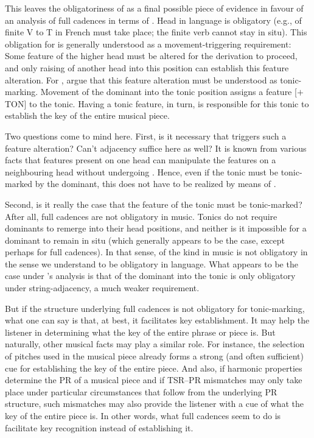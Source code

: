 \documentclass[output=paper]{langsci/langscibook}
\begin{document}
This leaves the obligatoriness of  as a final possible piece of
evidence in favour of an analysis of full cadences in terms of .
Head  in language is obligatory (e.g.,  of finite V to T in
French must take place; the finite verb cannot stay in situ). This obligation
for  is generally understood as a movement-triggering requirement:
Some feature of the higher head must be altered for the derivation to proceed,
and only raising of another head into this position can establish this feature
alteration. For , \citeauthor{KatzPes2011} argue that this feature
alteration must be understood as tonic-marking. Movement of the dominant into
the tonic position assigns a feature [$+$TON] to the tonic. Having a tonic
feature, in turn, is responsible for this tonic to establish the key of the
entire musical piece.

Two questions come to mind here. First, is it necessary that  triggers
such a feature alteration? Can’t adjacency suffice here as well? It is known
from various  facts that features present on one head can
manipulate the features on a neighbouring head without undergoing .
Hence, even if the tonic must be tonic-marked by the dominant, this does not
have to be realized by means of .

Second, is it really the case that the feature of the tonic must be
tonic-marked? After all, full cadences are not obligatory in music. Tonics do
not require dominants to remerge into their head positions, and neither is it
impossible for a dominant to remain in situ (which generally appears to be the
case, except perhaps for full cadences). In that sense,  of the
kind in music is not obligatory in the sense we understand  to be
obligatory in language. What appears to be the case under
\citeauthor{KatzPes2011}’s analysis is that  of the dominant into the
tonic is only obligatory under string-adjacency, a much weaker requirement.

But if the structure underlying full cadences is not obligatory for
tonic-mark\-ing, what one can say is that, at best, it facilitates key
establishment. It may help the listener in determining what the key of the
entire phrase or piece is. But naturally, other musical facts may play a
similar role. For instance, the selection of pitches used in the musical piece
already forms a strong (and often sufficient) cue for establishing the key of
the entire piece. And also, if harmonic properties determine the \gls{PR} of a
musical piece and if \gls{TSR}--\gls{PR} mismatches may only take place under
particular circumstances that follow from the underlying \gls{PR} structure,
such mismatches may also provide the listener with a cue of what the key of the
entire piece is. In other words, what full cadences seem to do is facilitate
key recognition instead of establishing it.
\end{document}
